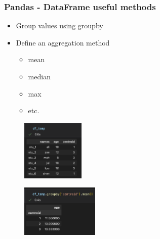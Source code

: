 \begin{frame}\frametitle{Pandas - DataFrame useful methods}
   \begin{minipage}{0.58\linewidth}
      \begin{itemize}
         \item Group values using groupby
         \item Define an aggregation method
         \begin{itemize}
            \item mean
            \item median
            \item max
            \item etc.
         \end{itemize}
      \end{itemize}
      \vspace{.5cm}
      \begin{figure}[H]
         \includegraphics[width=3cm]{../images/illustrations/pandas_df_ex_3.png}
      \end{figure}
   \end{minipage}
   \begin{minipage}{0.38\linewidth}
      \begin{figure}[H]
         \includegraphics[width=3.7cm]{../images/illustrations/pandas_groupby.png}
      \end{figure}
   \end{minipage}
\end{frame}

